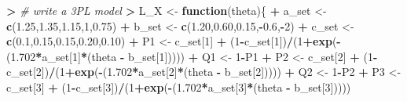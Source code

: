 \documentclass[
]{article}
\newenvironment{Shaded}{\begin{snugshade}}{\end{snugshade}}
\newcommand{\CommentTok}[1]{\textcolor[rgb]{0.56,0.35,0.01}{\textit{#1}}}
\newcommand{\ControlFlowTok}[1]{\textcolor[rgb]{0.13,0.29,0.53}{\textbf{#1}}}
\newcommand{\DecValTok}[1]{\textcolor[rgb]{0.00,0.00,0.81}{#1}}
\newcommand{\ErrorTok}[1]{\textcolor[rgb]{0.64,0.00,0.00}{\textbf{#1}}}
\newcommand{\FloatTok}[1]{\textcolor[rgb]{0.00,0.00,0.81}{#1}}
\newcommand{\FunctionTok}[1]{\textcolor[rgb]{0.13,0.29,0.53}{\textbf{#1}}}
\newcommand{\NormalTok}[1]{#1}
\newcommand{\OtherTok}[1]{\textcolor[rgb]{0.56,0.35,0.01}{#1}}
\newcommand{\SpecialCharTok}[1]{\textcolor[rgb]{0.81,0.36,0.00}{\textbf{#1}}}
\begin{document}
\begin{Shaded}
\begin{Highlighting}[]
\SpecialCharTok{\textgreater{}} \CommentTok{\# write a 3PL model}
\ErrorTok{\textgreater{}}\NormalTok{ L\_X }\OtherTok{\textless{}{-}} \ControlFlowTok{function}\NormalTok{(theta)\{}
\SpecialCharTok{+}\NormalTok{   a\_set }\OtherTok{\textless{}{-}} \FunctionTok{c}\NormalTok{(}\FloatTok{1.25}\NormalTok{,}\FloatTok{1.35}\NormalTok{,}\FloatTok{1.15}\NormalTok{,}\DecValTok{1}\NormalTok{,}\FloatTok{0.75}\NormalTok{)}
\SpecialCharTok{+}\NormalTok{   b\_set }\OtherTok{\textless{}{-}} \FunctionTok{c}\NormalTok{(}\FloatTok{1.20}\NormalTok{,}\FloatTok{0.60}\NormalTok{,}\FloatTok{0.15}\NormalTok{,}\SpecialCharTok{{-}}\FloatTok{0.6}\NormalTok{,}\SpecialCharTok{{-}}\DecValTok{2}\NormalTok{)}
\SpecialCharTok{+}\NormalTok{   c\_set }\OtherTok{\textless{}{-}} \FunctionTok{c}\NormalTok{(}\FloatTok{0.1}\NormalTok{,}\FloatTok{0.15}\NormalTok{,}\FloatTok{0.15}\NormalTok{,}\FloatTok{0.20}\NormalTok{,}\FloatTok{0.10}\NormalTok{)}
\SpecialCharTok{+}\NormalTok{   P1 }\OtherTok{\textless{}{-}}\NormalTok{ c\_set[}\DecValTok{1}\NormalTok{] }\SpecialCharTok{+}\NormalTok{ (}\DecValTok{1}\SpecialCharTok{{-}}\NormalTok{c\_set[}\DecValTok{1}\NormalTok{])}\SpecialCharTok{/}\NormalTok{(}\DecValTok{1}\SpecialCharTok{+}\FunctionTok{exp}\NormalTok{(}\SpecialCharTok{{-}}\NormalTok{(}\FloatTok{1.702}\SpecialCharTok{*}\NormalTok{a\_set[}\DecValTok{1}\NormalTok{]}\SpecialCharTok{*}\NormalTok{(theta }\SpecialCharTok{{-}}\NormalTok{ b\_set[}\DecValTok{1}\NormalTok{]))))}
\SpecialCharTok{+}\NormalTok{   Q1 }\OtherTok{\textless{}{-}} \DecValTok{1}\SpecialCharTok{{-}}\NormalTok{P1}
\SpecialCharTok{+}\NormalTok{   P2 }\OtherTok{\textless{}{-}}\NormalTok{ c\_set[}\DecValTok{2}\NormalTok{] }\SpecialCharTok{+}\NormalTok{ (}\DecValTok{1}\SpecialCharTok{{-}}\NormalTok{c\_set[}\DecValTok{2}\NormalTok{])}\SpecialCharTok{/}\NormalTok{(}\DecValTok{1}\SpecialCharTok{+}\FunctionTok{exp}\NormalTok{(}\SpecialCharTok{{-}}\NormalTok{(}\FloatTok{1.702}\SpecialCharTok{*}\NormalTok{a\_set[}\DecValTok{2}\NormalTok{]}\SpecialCharTok{*}\NormalTok{(theta }\SpecialCharTok{{-}}\NormalTok{ b\_set[}\DecValTok{2}\NormalTok{]))))}
\SpecialCharTok{+}\NormalTok{   Q2 }\OtherTok{\textless{}{-}} \DecValTok{1}\SpecialCharTok{{-}}\NormalTok{P2}
\SpecialCharTok{+}\NormalTok{   P3 }\OtherTok{\textless{}{-}}\NormalTok{ c\_set[}\DecValTok{3}\NormalTok{] }\SpecialCharTok{+}\NormalTok{ (}\DecValTok{1}\SpecialCharTok{{-}}\NormalTok{c\_set[}\DecValTok{3}\NormalTok{])}\SpecialCharTok{/}\NormalTok{(}\DecValTok{1}\SpecialCharTok{+}\FunctionTok{exp}\NormalTok{(}\SpecialCharTok{{-}}\NormalTok{(}\FloatTok{1.702}\SpecialCharTok{*}\NormalTok{a\_set[}\DecValTok{3}\NormalTok{]}\SpecialCharTok{*}\NormalTok{(theta }\SpecialCharTok{{-}}\NormalTok{ b\_set[}\DecValTok{3}\NormalTok{]))))}

\end{Highlighting}
\end{Shaded}
\end{document}
